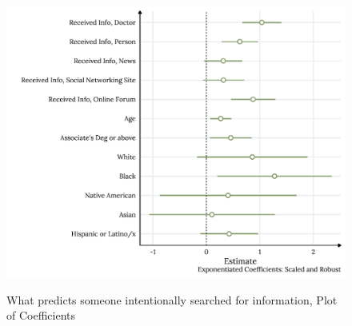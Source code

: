 

\begin{figure}[h]
{\centering \includegraphics[width=0.8\linewidth]{figs/paper2/plot-model-1-1}}
\caption{What predicts someone intentionally searched for information, Plot of Coefficients}\label{fig:plot-model-1}
\end{figure}

